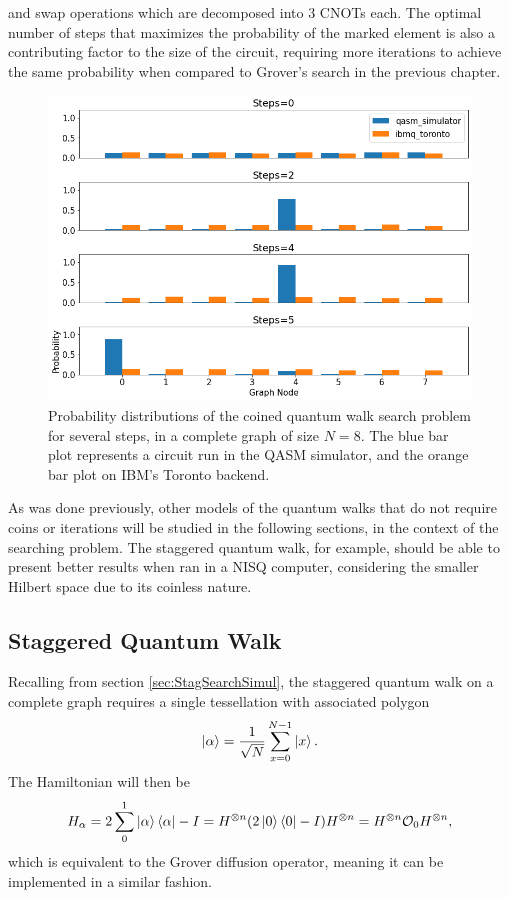 \documentclass[../../dissertation.tex]{subfiles}
\begin{document}
and swap operations which are decomposed into $3$ CNOTs each. The optimal
number of steps that maximizes the probability of the marked element is also a
contributing factor to the size of the circuit, requiring more iterations to
achieve the same probability when compared to Grover's search in the previous
chapter. 
\begin{figure}[!h]
	\centering
	\includegraphics[scale=0.40]{img/Qiskit/CoinedQuantumWalk/Search/CoinedQiskitSearch_N3_M4_S0245}
	\caption{Probability distributions of the coined quantum walk search problem for several steps, in a complete graph of size $N=8$. The blue bar plot represents a circuit run in the QASM simulator, and the orange bar plot on IBM's Toronto backend.} 
	\label{fig:coinedSearchQiskitDist}
\end{figure}\par

As was done previously, other models of the quantum walks that do
not require coins or iterations will be studied in the following sections, in
the context of the searching problem. The staggered quantum walk, for example,
should be able to present better results when ran in a NISQ computer, considering the
smaller Hilbert space due to its coinless nature.

\subsection{Staggered Quantum Walk}
Recalling from section \ref{sec:StagSearchSimul}, the staggered quantum walk on
a complete graph requires a single tessellation with associated polygon
\begin{equation}
	\ket{\alpha} = \frac{1}{\sqrt{N}} \sum_{x=0}^{N-1} \ket{x}.
\end{equation}
The Hamiltonian will then be 
\begin{equation}
	H_\alpha = 2\sum_0^1\ket{\alpha}\bra{\alpha} - I = H^{\otimes n} (2\ket{0}\bra{0} - I) H^{\otimes n} = H^{\otimes n} \mathcal{O}_0 H^{\otimes n},
\end{equation}
which is equivalent to the Grover diffusion operator, meaning it can be
implemented in a similar fashion. \par
\end{document}
